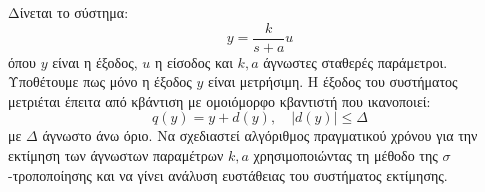 \documentclass[a4paper,11pt]{article}
\begin{document}
\begin{question}
Δίνεται το σύστημα:
\begin{equation}
    y = \frac{k}{s+a} u
\end{equation}
όπου $y$ είναι η έξοδος, $u$ η είσοδος και $k, a$ άγνωστες σταθερές παράμετροι. Υποθέτουμε πως μόνο η έξοδος $y$ είναι μετρήσιμη. Η έξοδος του συστήματος μετριέται έπειτα από κβάντιση με ομοιόμορφο κβαντιστή που ικανοποιεί:
\begin{equation}
    q(y) = y + d(y), \quad |d(y)| \le \Delta
\end{equation}
με $\Delta$ άγνωστο άνω όριο. Να σχεδιαστεί αλγόριθμος πραγματικού χρόνου για την εκτίμηση των άγνωστων παραμέτρων $k, a$ χρησιμοποιώντας τη μέθοδο της $\sigma$-τροποποίησης και να γίνει ανάλυση ευστάθειας του συστήματος εκτίμησης.
\end{question}
\end{document}
